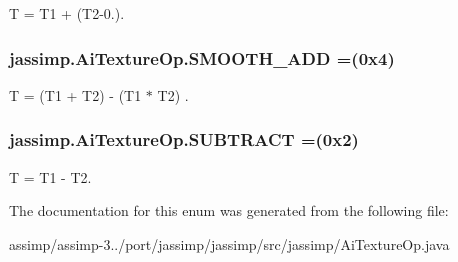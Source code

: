 {\ttfamily T = T1 + (T2-\/0.)}. \hypertarget{enumjassimp_1_1_ai_texture_op_a15b610c454cc3ee037588cd435cbcbf4}{
\subsubsection[{S\+M\+O\+O\+T\+H\+\_\+\+A\+D\+D}]{\setlength{\rightskip}{0pt plus 5cm}jassimp.\+Ai\+Texture\+Op.\+S\+M\+O\+O\+T\+H\+\_\+\+A\+D\+D =(0x4)}}\label{enumjassimp_1_1_ai_texture_op_a15b610c454cc3ee037588cd435cbcbf4}
{\ttfamily T = (T1 + T2) -\/ (T1 $\ast$ T2)} . \hypertarget{enumjassimp_1_1_ai_texture_op_a52d5b44dc359cde628df12f6d1cdf686}{
\subsubsection[{S\+U\+B\+T\+R\+A\+C\+T}]{\setlength{\rightskip}{0pt plus 5cm}jassimp.\+Ai\+Texture\+Op.\+S\+U\+B\+T\+R\+A\+C\+T =(0x2)}}\label{enumjassimp_1_1_ai_texture_op_a52d5b44dc359cde628df12f6d1cdf686}
{\ttfamily T = T1 -\/ T2}. 

The documentation for this enum was generated from the following file\+:\begin{DoxyCompactItemize}
\item 
assimp/assimp-\/3../port/jassimp/jassimp/src/jassimp/Ai\+Texture\+Op.\+java\end{DoxyCompactItemize}
